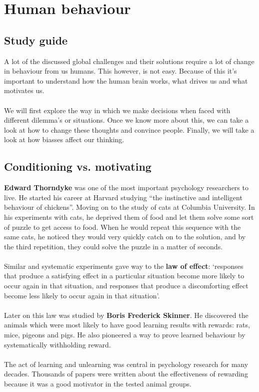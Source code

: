 \documentclass[../summary.tex]{subfiles}
\begin{document}
	\section{Human behaviour}
	
		\subsection{Study guide}
			A lot of the discussed global challenges and their solutions require a lot of change in behaviour from us humans. This however, is not easy. Because of this it's important to understand how the human brain works, what drives us and what motivates us. \\
			\\
			We will first explore the way in which we make decisions when faced with different dilemma's or situations. Once we know more about this, we can take a look at how to change these thoughts and convince people. Finally, we will take a look at how biasses affect our thinking. 
		\subsection{Conditioning vs. motivating}
			\textbf{Edward Thorndyke} was one of the most important psychology researchers to live. He started his career at Harvard studying ``the instinctive and intelligent behaviour of chickens''. Moving on to the study of cats at Columbia University. In his experiments with cats, he deprived them of food and let them solve some sort of puzzle to get access to food. When he would repeat this sequence with the same cats, he noticed they would very quickly catch on to the solution, and by the third repetition, they could solve the puzzle in a matter of seconds. \\
			\\
			Similar and systematic experiments gave way to the \textbf{law of effect}: `responses that produce a satisfying effect in a particular situation become more likely to occur again in that situation, and responses that produce a discomforting effect become less likely to occur again in that situation'.\\
			\\
			Later on this law was studied by \textbf{Boris Frederick Skinner}.   He discovered the animals which were most likely to have good learning results with rewards: rats, mice, pigeons and pigs. He also pioneered a way to prove learned behaviour by systematically withholding reward. \\
			\\
			The act of learning and unlearning was central in psychology research for many decades. Thousands of papers were written about the effectiveness of rewarding because it was a good motivator in the tested animal groups. 
\end{document}

